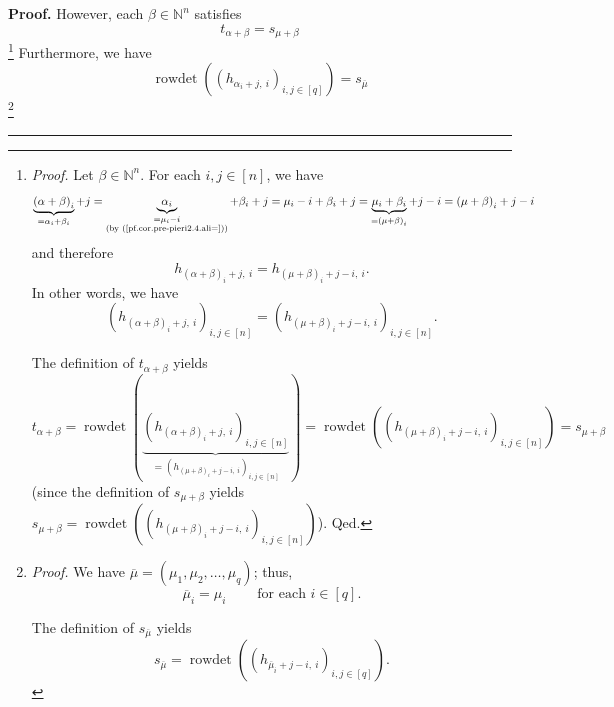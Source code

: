 \documentclass
[numbers=enddot,12pt,final,onecolumn,notitlepage,english]{scrartcl}%
\theoremstyle{definition}
\newenvironment{proof}[1][Proof]{\noindent\textbf{#1.} }{\ \rule{0.5em}{0.5em}}
\newenvironment{verlong}{}{}
\begin{document}
\begin{verlong}
\begin{proof}
However, each $\beta\in\mathbb{N}^{n}$ satisfies
\begin{equation}
t_{\alpha+\beta}=s_{\mu+\beta} \label{pf.cor.pre-pieri2.4.3}%
\end{equation}
\footnote{\textit{Proof.} Let $\beta\in\mathbb{N}^{n}$. For each
$i,j\in\left[  n\right]  $, we have%
\[
\underbrace{\left(  \alpha+\beta\right)  _{i}}_{=\alpha_{i}+\beta_{i}%
}+j=\underbrace{\alpha_{i}}_{\substack{=\mu_{i}-i\\\text{(by
(\ref{pf.cor.pre-pieri2.4.ali=}))}}}+\beta_{i}+j=\mu_{i}-i+\beta
_{i}+j=\underbrace{\mu_{i}+\beta_{i}}_{=\left(  \mu+\beta\right)  _{i}%
}+j-i=\left(  \mu+\beta\right)  _{i}+j-i
\]
and therefore
\[
h_{\left(  \alpha+\beta\right)  _{i}+j,\ i}=h_{\left(  \mu+\beta\right)
_{i}+j-i,\ i}.
\]
In other words, we have%
\[
\left(  h_{\left(  \alpha+\beta\right)  _{i}+j,\ i}\right)  _{i,j\in\left[
n\right]  }=\left(  h_{\left(  \mu+\beta\right)  _{i}+j-i,\ i}\right)
_{i,j\in\left[  n\right]  }.
\]
\par
The definition of $t_{\alpha+\beta}$ yields
\[
t_{\alpha+\beta}=\operatorname*{rowdet}\left(  \underbrace{\left(  h_{\left(
\alpha+\beta\right)  _{i}+j,\ i}\right)  _{i,j\in\left[  n\right]  }%
}_{=\left(  h_{\left(  \mu+\beta\right)  _{i}+j-i,\ i}\right)  _{i,j\in\left[
n\right]  }}\right)  =\operatorname*{rowdet}\left(  \left(  h_{\left(
\mu+\beta\right)  _{i}+j-i,\ i}\right)  _{i,j\in\left[  n\right]  }\right)
=s_{\mu+\beta}%
\]
(since the definition of $s_{\mu+\beta}$ yields $s_{\mu+\beta}%
=\operatorname*{rowdet}\left(  \left(  h_{\left(  \mu+\beta\right)
_{i}+j-i,\ i}\right)  _{i,j\in\left[  n\right]  }\right)  $). Qed.}
Furthermore, we have
\begin{equation}
\operatorname*{rowdet}\left(  \left(  h_{\alpha_{i}+j,\ i}\right)
_{i,j\in\left[  q\right]  }\right)  =s_{\overline{\mu}}
\label{pf.cor.pre-pieri2.4.4}%
\end{equation}
\footnote{\textit{Proof.} We have $\overline{\mu}=\left(  \mu_{1},\mu
_{2},\ldots,\mu_{q}\right)  $; thus,
\begin{equation}
\overline{\mu}_{i}=\mu_{i}\ \ \ \ \ \ \ \ \ \ \text{for each }i\in\left[
q\right]  . \label{pf.cor.pre-pieri2.4.4.pf.1}%
\end{equation}
\par
The definition of $s_{\overline{\mu}}$ yields%
\begin{equation}
s_{\overline{\mu}}=\operatorname*{rowdet}\left(  \left(  h_{\overline{\mu}%
_{i}+j-i,\ i}\right)  _{i,j\in\left[  q\right]  }\right)  .
\label{pf.cor.pre-pieri2.4.4.pf.2}%

\end{equation}}
\end{proof}
\end{verlong}
\end{document}
